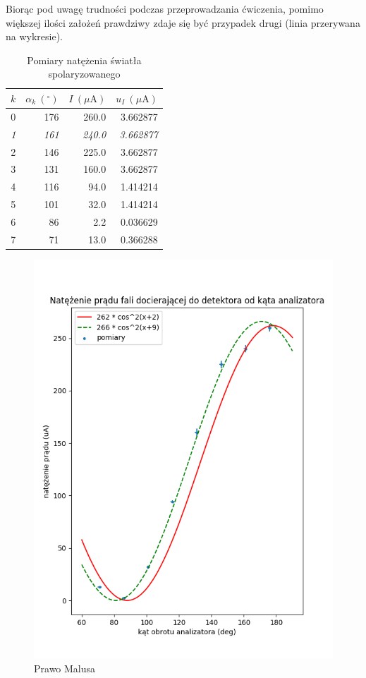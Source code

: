 \documentclass[a4paper]{article}
\begin{document}
Biorąc pod uwagę trudności podczas przeprowadzania ćwiczenia, pomimo większej ilości założeń prawdziwy zdaje się być przypadek drugi (linia przerywana na wykresie).


\begin{table}[h]
\centering
\begin{tabular}{rrrr}
\toprule
 $k$ &  $\alpha_k \ ({}^\circ)$ &  $I \ (\mu\text{A})$ &  $u_I \ (\mu \text{A})$ \\
\midrule
 0 &       176 &   260.0 &         3.662877 \\
 \textit{1} & 	   \textit{161} &   \textit{240.0} &         \textit{3.662877} \\
 2 &       146 &   225.0 &         3.662877 \\
 3 &       131 &   160.0 &         3.662877 \\
 4 &       116 &    94.0 &         1.414214 \\
 5 &       101 &    32.0 &         1.414214 \\
 6 &        86 &     2.2 &         0.036629 \\
 7 &        71 &    13.0 &         0.366288 \\
\bottomrule
\end{tabular}
\caption{Pomiary natężenia światła spolaryzowanego}
\label{malus-pomiary}
\end{table}

\begin{figure}[b]
\centering
\includegraphics[scale=0.8]{malus.png}
\caption{Prawo Malusa}
\label{malus-wykres}
\end{figure}
\end{document}
